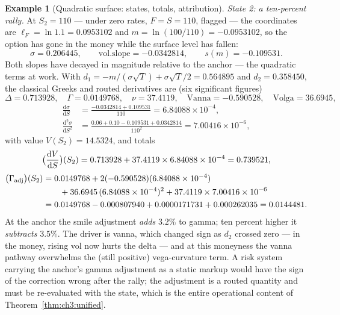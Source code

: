 \documentclass[11pt]{book}
\theoremstyle{plain}
\theoremstyle{definition}
\newtheorem{example}[theorem]{Example}
\theoremstyle{remark}
\newcommand{\mln}{m}                             %
\newcommand{\lF}{\ell_F}                         %
\newcommand{\volslope}{\mathrm{vol.slope}}       %
\newcommand{\vega}{\nu}                          %
\newcommand{\Vanna}{\mathrm{Vanna}}
\newcommand{\Volga}{\mathrm{Volga}}
\newcommand{\Gadj}{\Gamma_{\mathrm{adj}}}        %
\newcommand{\dd}{\mathrm{d}}                                  %
\newcommand{\td}[2]{\frac{\dd #1}{\dd #2}}                    %
\begin{document}
\begin{example}[Quadratic surface: states, totals, attribution]
\emph{State 2: a ten-percent rally.} At $S_2 = 110$ --- under zero rates,
$F = S = 110$, flagged --- the coordinates are $\lF = \ln 1.1 = 0.0953102$
and $\mln = \ln(100/110) = -0.0953102$, so the option has gone in the money
while the surface level has fallen:
\[
  \sigma = 0.206445, \qquad
  \volslope = -0.0342814, \qquad
  s(\mln) = -0.109531 .
\]
Both slopes have decayed in magnitude relative to the anchor --- the
quadratic terms at work. With $d_1 = -\mln/(\sigma\sqrt{T}) +
\sigma\sqrt{T}/2 = 0.564895$ and $d_2 = 0.358450$, the classical Greeks and
routed derivatives are (six significant figures)
\[
  \Delta = 0.713928, \quad
  \Gamma = 0.0149768, \quad
  \vega = 37.4119, \quad
  \Vanna = -0.590528, \quad
  \Volga = 36.6945,
\]
\begin{align*}
  \td{\sigma}{S} &= \frac{-0.0342814 + 0.109531}{110} = 6.84088\times10^{-4},\\
  \frac{\dd^2\sigma}{\dd S^2}
  &= \frac{0.06 + 0.10 - 0.109531 + 0.0342814}{110^2}
  = 7.00416\times10^{-6},
\end{align*}
with value $V(S_2) = 14.5324$, and totals
\[
  \evalat{\td{V}{S}}{S_2} = 0.713928 + 37.4119 \times 6.84088\times10^{-4}
  = 0.739521,
\]
\begin{align*}
  \evalat{\Gadj}{S_2}
  &= 0.0149768
   + 2(-0.590528)(6.84088\times10^{-4}) \\
  &\qquad
   + 36.6945\,(6.84088\times10^{-4})^2
   + 37.4119 \times 7.00416\times10^{-6} \\
  &= 0.0149768 - 0.000807940 + 0.0000171731 + 0.000262035
   = 0.0144481 .
\end{align*}
At the anchor the smile adjustment \emph{adds} $3.2\%$ to
gamma; ten percent higher it \emph{subtracts} $3.5\%$. The driver is vanna,
which changed sign as $d_2$ crossed zero --- in the money, rising vol now
hurts the delta --- and at this moneyness the vanna pathway overwhelms the
(still positive) vega-curvature term. A risk system carrying the anchor's
gamma adjustment as a static markup would have the sign of the correction
wrong after the rally; the adjustment is a routed quantity and must be
re-evaluated with the state, which is the entire operational content of
Theorem~\ref{thm:ch3:unified}.


\end{example}
\end{document}
